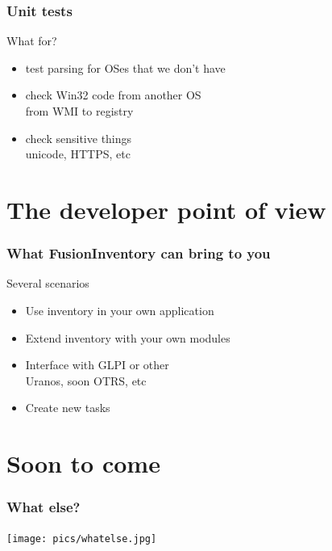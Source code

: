 \documentclass{beamer}
\begin{document}
\begin{frame}
    \frametitle{Unit tests}

    \begin{block}{What for?}
        \begin{itemize}
            \item test parsing for OSes that we don't have
            \item check Win32 code from another OS \\
            \small{from WMI to registry}
            \item check sensitive things \\
            \small{unicode, HTTPS, etc}
        \end{itemize}
    \end{block}

\end{frame}

\section{The developer point of view}

\begin{frame}
    \frametitle{What FusionInventory can bring to you}

    \begin{block}{Several scenarios}
        \begin{itemize}
            \item Use inventory in your own application
            \item Extend inventory with your own modules
            \item Interface with GLPI or other \\
            \small{Uranos, soon OTRS, etc}
            \item Create new tasks
        \end{itemize}
    \end{block}

\end{frame}

\section{Soon to come}

\begin{frame}
    \frametitle{What else?}

    \begin{center}
    \texttt{[image: pics/whatelse.jpg]}
    \end{center}

\end{frame}
\end{document}
